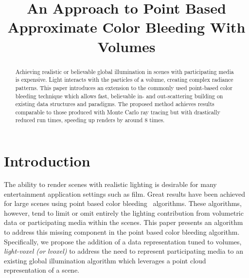 \documentclass[runningheads]{llncs}
\begin{document}
\pagestyle{headings}



\mainmatter

\title{An Approach to Point Based Approximate Color Bleeding With Volumes}


\maketitle


\begin{abstract}
Achieving realistic or believable global illumination in scenes with participating media is expensive.  Light interacts with the particles of a volume, creating complex radiance patterns.  This paper introduces an extension to the commonly used point-based color bleeding technique which allows fast, believable in- and out-scattering building on existing data structures and paradigms.  The proposed method achieves results comparable to those produced with Monte Carlo ray tracing but with drastically reduced run times, speeding up renders by around 8 times. 
\end{abstract}



\section{Introduction}
The ability to render scenes with realistic lighting is desirable for many entertainment application settings such as film.  Great results have been achieved for large scenes using point based color bleeding~\cite{christensen:2008} algorithms.  These algorithms, however, tend to limit or omit entirely the lighting contribution from volumetric data or participating media within the scenes.  This paper presents an algorithm to address this missing component in the point based color bleeding algorithm.  Specifically, we propose the addition of a data representation tuned to volumes,  \emph{light-voxel (or lvoxel)} to address the need to represent participating media to an existing global illumination algorithm which leverages a point cloud representation of a scene.  
\end{document}
